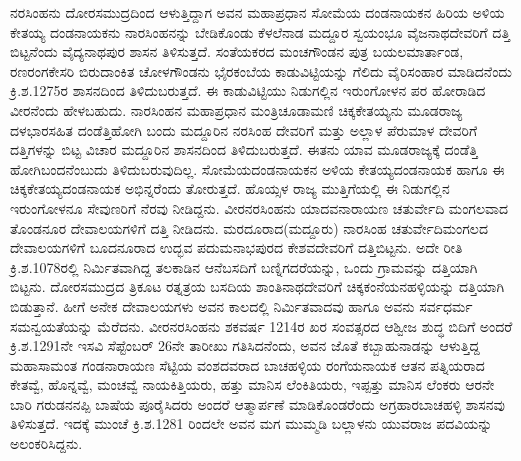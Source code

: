 ನರಸಿಂಹನು ದೋರಸಮುದ್ರದಿಂದ ಆಳುತ್ತಿದ್ದಾಗ ಅವನ ಮಹಾಪ್ರಧಾನ ಸೋಮೆಯ ದಂಡನಾಯಕನ ಹಿರಿಯ ಅಳಿಯ ಕೇತಯ್ಯ ದಂಡನಾಯಕನು ನಾರಸಿಂಹನನ್ನು ಬೇಡಿಕೊಂಡು ಕೆಳಲೆನಾಡ ಮದ್ದೂರ ಸ್ವಯಂಭೂ ವೈಜನಾಥದೇವರಿಗೆ ದತ್ತಿ ಬಿಟ್ಟನೆಂದು ವೈದ್ಯನಾಥಪುರ ಶಾಸನ ತಿಳಿಸುತ್ತದೆ. ಸಂತೆಯಕರದ ಮಂಚಗೌಂಡನ ಪುತ್ರ ಬಯಲಮಾರ್ತಾಂಡ, ರಣರಂಗಕೇಸರಿ ಬಿರುದಾಂಕಿತ ಚೋಳಗೌಂಡನು ಭೈರಕಂಬೆಯ ಕಾಡುವಿಟ್ಟಿಯನ್ನು ಗೆಲಿದು ವೈರಿಸಂಹಾರ ಮಾಡಿದನೆಂದು ಕ್ರಿ.ಶ.1275ರ ಶಾಸನದಿಂದ ತಿಳಿದುಬರುತ್ತದೆ. ಈ ಕಾಡುವಿಟ್ಟಿಯು ನಿಡುಗಲ್ಲಿನ ಇರುಂಗೋಳನ ಪರ ಹೋರಾಡಿದ ವೀರನೆಂದು ಹೇಳಬಹುದು. ನಾರಸಿಂಹನ ಮಹಾಪ್ರಧಾನ ಮಂತ್ರಿಚೂಡಾಮಣಿ ಚಿಕ್ಕಕೇತಯ್ಯನು ಮೂಡರಾಜ್ಯ ದಳಭಾರಸಹಿತ ದಂಡೆತ್ತಿಹೋಗಿ ಬಂದು ಮದ್ದೂರಿನ ನರಸಿಂಹ ದೇವರಿಗೆ ಮತ್ತು ಅಲ್ಲಾಳ ಪೆರುಮಾಳ ದೇವರಿಗೆ ದತ್ತಿಗಳನ್ನು ಬಿಟ್ಟ ವಿಚಾರ ಮದ್ದೂರಿನ ಶಾಸನದಿಂದ ತಿಳಿದುಬರುತ್ತದೆ. ಈತನು ಯಾವ ಮೂಡರಾಜ್ಯಕ್ಕೆ ದಂಡೆತ್ತಿ ಹೋಗಿಬಂದನೆಂಬುದು ತಿಳಿದು\-ಬರುವುದಿಲ್ಲ. ಸೋಮೆಯದಂಡನಾಯಕನ ಅಳಿಯ ಕೇತಯ್ಯದಂಡನಾಯಕ ಹಾಗೂ ಈ ಚಿಕ್ಕಕೇತಯ್ಯದಂಡನಾಯಕ ಅಭಿನ್ನರೆಂದು ತೋರುತ್ತದೆ. ಹೊಯ್ಸಳ ರಾಜ್ಯ ಮುತ್ತಿಗೆಯಲ್ಲಿ ಈ ನಿಡುಗಲ್ಲಿನ ಇರುಂಗೋಳನೂ ಸೇವುಣರಿಗೆ ನೆರವು ನೀಡಿದ್ದನು. ವೀರನರಸಿಂಹನು ಯಾದವನಾರಾಯಣ ಚತುರ್ವೇದಿ ಮಂಗಲವಾದ ತೊಂಡನೂರ ದೇವಾಲಯಗಳಿಗೆ ದತ್ತಿ ನೀಡಿದನು. ಮರದೂರಾದ(ಮದ್ದೂರು) ನಾರಸಿಂಹ ಚತುರ್ವೇದಿಮಂಗಲದ ದೇವಾಲಯಗಳಿಗೆ ಬೂದನೂರಾದ ಉದ್ಭವ ಪದುಮನಾಭಪುರದ ಕೇಶವದೇವರಿಗೆ  ದತ್ತಿಬಿಟ್ಟನು. ಅದೇ ರೀತಿ ಕ್ರಿ.ಶ.1078ರಲ್ಲಿ ನಿರ್ಮಿತವಾಗಿದ್ದ ತಲಕಾಡಿನ ಆನೆಬಸದಿಗೆ ಬಣ್ನಿಗದರೆಯನ್ನು, ಒಂದು ಗ್ರಾಮವನ್ನು ದತ್ತಿಯಾಗಿ ಬಿಟ್ಟನು. ದೋರಸಮುದ್ರದ ತ್ರಿಕೂಟ ರತ್ನತ್ರಯ ಬಸದಿಯ ಶಾಂತಿನಾಥದೇವರಿಗೆ ಚಿಕ್ಕಕಂನೆಯನಹಳ್ಳಿಯನ್ನು ದತ್ತಿಯಾಗಿ ಬಿಡುತ್ತಾನೆ. ಹೀಗೆ ಅನೇಕ ದೇವಾಲಯಗಳು ಅವನ ಕಾಲದಲ್ಲಿ ನಿರ್ಮಿತವಾದವು ಹಾಗೂ ಅವನು ಸರ್ವಧರ್ಮ ಸಮನ್ವಯತೆಯನ್ನು ಮೆರೆದನು. ವೀರನರಸಿಂಹನು ಶಕವರ್ಷ 1214ರ ಖರ ಸಂವತ್ಸರದ ಆಶ್ವೀಜ ಶುದ್ಧ ಬಿದಿಗೆ ಅಂದರೆ ಕ್ರಿ.ಶ.1291ನೇ ಇಸವಿ ಸೆಪ್ಟೆಂಬರ್​ 26ನೇ ತಾರೀಖು ಗತಿಸಿದನೆಂದು, ಅವನ ಜೊತೆ ಕಬ್ಬಾಹುನಾಡನ್ನು ಆಳುತ್ತಿದ್ದ ಮಹಾಸಾಮಂತ ಗಂಡನಾರಾಯಣ ಸೆಟ್ಟಿಯ ವಂಶದವರಾದ ಬಾಚಹಳ್ಳಿಯ ರಂಗೆಯನಾಯಕ ಆತನ ಪತ್ನಿಯರಾದ ಕೇತವ್ವೆ, ಹೊನ್ನವ್ವೆ, ಮಂಚವ್ವೆ ನಾಯಕಿತ್ತಿಯರು, ಹತ್ತು ಮಾನಿಸ ಲೆಂಕಿತಿಯರು, ಇಪ್ಪತ್ತು ಮಾನಿಸ ಲೆಂಕರು ಆರನೇ ಬಾರಿ ಗರುಡನನಪ್ಪಿ ಬಾಷೆಯ ಪೂರೈಸಿದರು ಅಂದರೆ ಆತ್ಮಾರ್ಪಣೆ ಮಾಡಿಕೊಂಡರೆಂದು ಅಗ್ರಹಾರಬಾಚಹಳ್ಳಿ ಶಾಸನವು ತಿಳಿಸುತ್ತದೆ. ಇದಕ್ಕೆ ಮುಂಚೆ ಕ್ರಿ.ಶ.1281 ರಿಂದಲೇ ಅವನ ಮಗ ಮುಮ್ಮಡಿ ಬಲ್ಲಾಳನು ಯುವರಾಜ ಪದವಿಯನ್ನು ಅಲಂಕರಿಸಿದ್ದನು.


